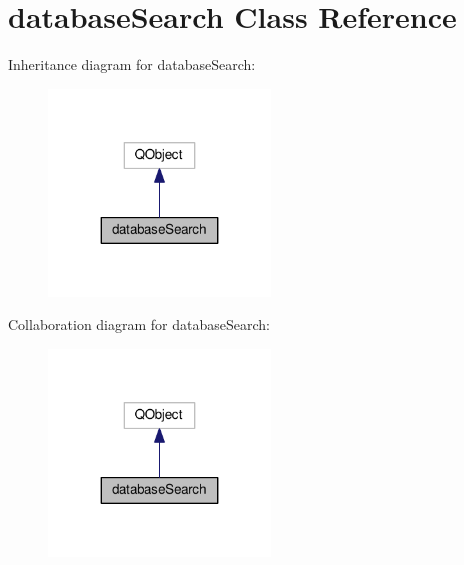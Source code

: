 \hypertarget{classdatabaseSearch}{}\section{database\+Search Class Reference}
\label{classdatabaseSearch}


Inheritance diagram for database\+Search\+:\nopagebreak
\begin{figure}[H]
\begin{center}
\leavevmode
\includegraphics[width=167pt]{classdatabaseSearch__inherit__graph}
\end{center}
\end{figure}


Collaboration diagram for database\+Search\+:\nopagebreak
\begin{figure}[H]
\begin{center}
\leavevmode
\includegraphics[width=167pt]{classdatabaseSearch__coll__graph}
\end{center}
\end{figure}
